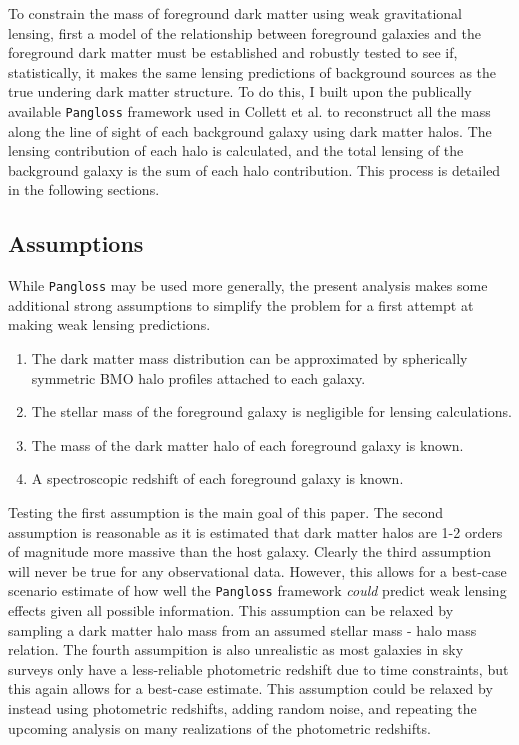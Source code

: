 \documentclass[%
 reprint,
 amsmath,amssymb,
 aps,
]{revtex4-1}
\begin{document}
To constrain the mass of foreground dark matter using weak gravitational lensing, first a model of the relationship between foreground galaxies and the foreground dark matter must be established and robustly tested to see if, statistically, it makes the same lensing predictions of background sources as the true undering dark matter structure. To do this, I built upon the publically available \texttt{Pangloss} framework used in Collett et al.\cite{collett_marshall} to reconstruct all the mass along the line of sight of each background galaxy using dark matter halos. The lensing contribution of each halo is calculated, and the total lensing of the background galaxy is the sum of each halo contribution. This process is detailed in the following sections.

\subsection*{Assumptions}
While \texttt{Pangloss} may be used more generally, the present analysis makes some additional strong assumptions to simplify the problem for a first attempt at making weak lensing predictions.

\begin{enumerate}
\item The dark matter mass distribution can be approximated by spherically symmetric BMO halo profiles attached to each galaxy.
\item The stellar mass of the foreground galaxy is negligible for lensing calculations.
\item The mass of the dark matter halo of each foreground galaxy is known.
\item A spectroscopic redshift of each foreground galaxy is known.
\end{enumerate}

Testing the first assumption is the main goal of this paper. The second assumption is reasonable as it is estimated that dark matter halos are 1-2 orders of magnitude more massive than the host galaxy\cite{smhr}. Clearly the third assumption will never be true for any observational data. However, this allows for a best-case scenario estimate of how well the \texttt{Pangloss} framework \textit{could} predict weak lensing effects given all possible information. This assumption can be relaxed by sampling a dark matter halo mass from an assumed stellar mass - halo mass relation. The fourth assumpition is also unrealistic as most galaxies in sky surveys only have a less-reliable photometric redshift due to time constraints, but this again allows for a best-case estimate. This assumption could be relaxed by instead using photometric redshifts, adding random noise, and repeating the upcoming analysis on many realizations of the photometric redshifts.
\end{document}
